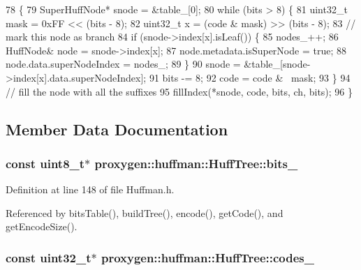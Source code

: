 \begin{DoxyCode}
78                                                              \{
79   SuperHuffNode* snode = &table_[0];
80   \textcolor{keywordflow}{while} (bits > 8) \{
81     uint32\_t mask = 0xFF << (bits - 8);
82     uint32\_t x = (code & mask) >> (bits - 8);
83     \textcolor{comment}{// mark this node as branch}
84     \textcolor{keywordflow}{if} (snode->index[x].isLeaf()) \{
85       nodes_++;
86       HuffNode& node = snode->index[x];
87       node.metadata.isSuperNode = \textcolor{keyword}{true};
88       node.data.superNodeIndex = nodes_;
89     \}
90     snode = &table_[snode->index[x].data.superNodeIndex];
91     bits -= 8;
92     code = code & ~mask;
93   \}
94   \textcolor{comment}{// fill the node with all the suffixes}
95   fillIndex(*snode, code, bits, ch, bits);
96 \}
\end{DoxyCode}


\subsection{Member Data Documentation}
\subsubsection[{bits\+\_\+}]{\setlength{\rightskip}{0pt plus 5cm}const uint8\+\_\+t$\ast$ proxygen\+::huffman\+::\+Huff\+Tree\+::bits\+\_\+\hspace{0.3cm}{\ttfamily [private]}}\label{classproxygen_1_1huffman_1_1HuffTree_aa361cd824d7b8af43423a484217f1306}


Definition at line 148 of file Huffman.\+h.



Referenced by bits\+Table(), build\+Tree(), encode(), get\+Code(), and get\+Encode\+Size().

\subsubsection[{codes\+\_\+}]{\setlength{\rightskip}{0pt plus 5cm}const uint32\+\_\+t$\ast$ proxygen\+::huffman\+::\+Huff\+Tree\+::codes\+\_\+\hspace{0.3cm}{\ttfamily [private]}}\label{classproxygen_1_1huffman_1_1HuffTree_a83645dcd5290d5d11548d7934a51fe4b}


